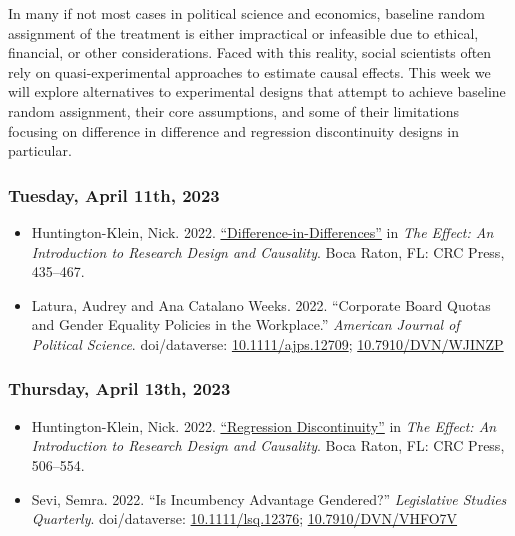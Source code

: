 \documentclass[12pt,]{article}
\begin{document}
\noindent In many if not most cases in political science and economics,
baseline random assignment of the treatment is either impractical or
infeasible due to ethical, financial, or other considerations. Faced
with this reality, social scientists often rely on quasi-experimental
approaches to estimate causal effects. This week we will explore
alternatives to experimental designs that attempt to achieve baseline
random assignment, their core assumptions, and some of their limitations
focusing on difference in difference and regression discontinuity
designs in particular.

\hypertarget{tuesday-april-11th-2023}{%
\subsubsection{Tuesday, April 11th,
2023}\label{tuesday-april-11th-2023}}

\begin{itemize}
\item
  Huntington-Klein, Nick. 2022.
  \href{https://theeffectbook.net/ch-DifferenceinDifference.html}{``Difference-in-Differences''}
  in \emph{The Effect: An Introduction to Research Design and
  Causality}. Boca Raton, FL: CRC Press, 435--467.
\item
  Latura, Audrey and Ana Catalano Weeks. 2022. ``Corporate Board Quotas
  and Gender Equality Policies in the Workplace.'' \emph{American
  Journal of Political Science}. doi/dataverse:
  \href{https://doi.org/10.1111/ajps.12709}{10.1111/ajps.12709};
  \href{https://dataverse.harvard.edu/dataset.xhtml?persistentId=doi:10.7910/DVN/WJINZP}{10.7910/DVN/WJINZP}
\end{itemize}

\hypertarget{thursday-april-13th-2023}{%
\subsubsection{Thursday, April 13th,
2023}\label{thursday-april-13th-2023}}

\begin{itemize}
\item
  Huntington-Klein, Nick. 2022.
  \href{https://theeffectbook.net/ch-RegressionDiscontinuity.html}{``Regression
  Discontinuity''} in \emph{The Effect: An Introduction to Research
  Design and Causality}. Boca Raton, FL: CRC Press, 506--554.
\item
  Sevi, Semra. 2022. ``Is Incumbency Advantage Gendered?''
  \emph{Legislative Studies Quarterly}. doi/dataverse:
  \href{https://doi.org/10.1111/lsq.12376}{10.1111/lsq.12376};
  \href{https://dataverse.harvard.edu/dataset.xhtml?persistentId=doi:10.7910/DVN/VHFO7V}{10.7910/DVN/VHFO7V}
\end{itemize}
\end{document}
